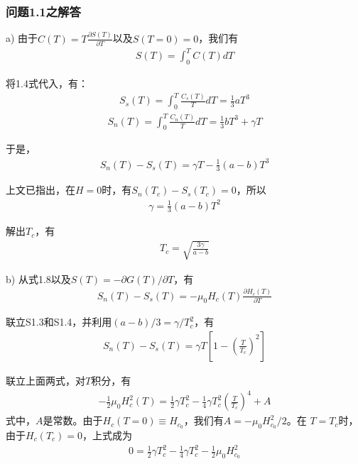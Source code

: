 \subsubsection{问题1.1之解答}
a) 由于$C(T)=T\frac{\partial S(T)}{\partial T}$以及$S(T=0)=0$，我们有
\begin{align*}
S(T) =\int_{0}^{T}C(T)dT \tag{S1.1} 
\end{align*} 

将1.4式代入，有：
\begin{align*}
S_s(T) =\int_{0}^{T}\frac{C_s(T)}{T}dT=\frac{1}{3}aT^3 \tag{S1.2a}
\end{align*} 
\begin{align*}
S_n(T) =\int_{0}^{T}\frac{C_n(T)}{T}dT = \frac{1}{3}bT^3 + \gamma T \tag{S1.2b}
\end{align*} 

于是，
\begin{align*}
S_n(T) − S_s(T) =\gamma T − \frac{1}{3} (a − b)T^3\tag{S1.3}
\end{align*} 

上文已指出，在$H=0$时，有$S_n(T_c)−S_s(T_c)=0$，所以
\begin{align*}
\gamma= \frac{1}{3} (a − b)T^2 \tag{S1.4}
\end{align*}

解出$T_c$，有
\begin{align*}
T_c=\sqrt{\frac{3\gamma}{a-b}} \tag{1.5}
\end{align*}

b) 从式1.8以及$S(T)=−\partial G(T)/\partial T$，有
\begin{align*}
S_n(T) − S_s(T) = −\mu_0 H_c(T)\frac{\partial H_c(T)}{\partial T}\tag{S1.5}
\end{align*}

联立S1.3和S1.4，并利用$(a-b)/3=\gamma/T_c^2$，有
\begin{align*}
S_n(T) − S_s(T)=\gamma T\left[1-\left(\frac{T}{T_c}\right)^2\right]  \tag{S1.6}
\end{align*}

联立上面两式，对$T$积分，有
\begin{align*}
−\frac{1}{2}\mu_0 H_c^2(T) =\frac{1}{2}\gamma T_c^2-
\frac{1}{4}\gamma T_c^2 \left(\frac{T}{T_c}\right)^4+A \tag{S1.7}
\end{align*}
式中，$A$是常数。由于$H_c(T =0)\equiv H_{c_0}$，我们有$A=−\mu_0 H_{c_0}^2 / 2$。在
$T=T_c$时，由于$H_c(T_c)=0$，上式成为
\begin{align*}
0=\frac{1}{2}\gamma T_c^2-\frac{1}{4}\gamma T_c^2-\frac{1}{2}\mu_0 H_{c_0}^2\tag{S1.8}
\end{align*}

